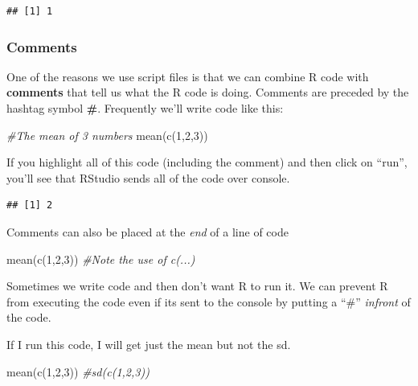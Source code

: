 \documentclass[
]{book}
\newenvironment{Shaded}{\begin{snugshade}}{\end{snugshade}}
\newcommand{\CommentTok}[1]{\textcolor[rgb]{0.56,0.35,0.01}{\textit{#1}}}
\newcommand{\DecValTok}[1]{\textcolor[rgb]{0.00,0.00,0.81}{#1}}
\newcommand{\FunctionTok}[1]{\textcolor[rgb]{0.00,0.00,0.00}{#1}}
\newcommand{\NormalTok}[1]{#1}
\begin{document}
\begin{verbatim}
## [1] 1
\end{verbatim}

\hypertarget{comments}{%
\subsubsection{Comments}\label{comments}}

One of the reasons we use script files is that we can combine R code with \textbf{comments} that tell us what the R code is doing. Comments are preceded by the hashtag symbol \textbf{\#}. Frequently we'll write code like this:

\begin{Shaded}
\begin{Highlighting}[]
\CommentTok{\#The mean of 3 numbers}
\FunctionTok{mean}\NormalTok{(}\FunctionTok{c}\NormalTok{(}\DecValTok{1}\NormalTok{,}\DecValTok{2}\NormalTok{,}\DecValTok{3}\NormalTok{))}
\end{Highlighting}
\end{Shaded}

If you highlight all of this code (including the comment) and then click on ``run'', you'll see that RStudio sends all of the code over console.

\begin{verbatim}
## [1] 2
\end{verbatim}

Comments can also be placed at the \emph{end} of a line of code

\begin{Shaded}
\begin{Highlighting}[]
\FunctionTok{mean}\NormalTok{(}\FunctionTok{c}\NormalTok{(}\DecValTok{1}\NormalTok{,}\DecValTok{2}\NormalTok{,}\DecValTok{3}\NormalTok{)) }\CommentTok{\#Note  the use of c(...)}
\end{Highlighting}
\end{Shaded}

Sometimes we write code and then don't want R to run it. We can prevent R from executing the code even if its sent to the console by putting a ``\#'' \emph{infront} of the code.

If I run this code, I will get just the mean but not the sd.

\begin{Shaded}
\begin{Highlighting}[]
\FunctionTok{mean}\NormalTok{(}\FunctionTok{c}\NormalTok{(}\DecValTok{1}\NormalTok{,}\DecValTok{2}\NormalTok{,}\DecValTok{3}\NormalTok{))}
\CommentTok{\#sd(c(1,2,3))}
\end{Highlighting}
\end{Shaded}
\end{document}
